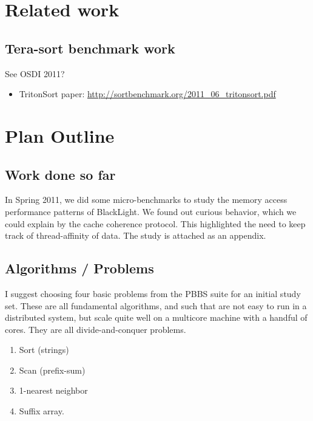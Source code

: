 \documentclass[12pt]{article}
\begin{document}
 
\section{Related work}

\subsection{Tera-sort benchmark work}

See OSDI 2011?

\begin{itemize}
\item TritonSort paper: \url{http://sortbenchmark.org/2011_06_tritonsort.pdf}
\end{itemize}

\section{Plan Outline}

\subsection{Work done so far}

In Spring 2011, we did some micro-benchmarks to study the memory access performance patterns of BlackLight.
We found out curious behavior, which we could explain by the cache coherence protocol. This highlighted the need
to keep track of thread-affinity of data.  The study is attached as an appendix.

\subsection{Algorithms / Problems}

I suggest choosing four basic problems from the PBBS suite for an initial study set. These are all
fundamental algorithms, and such that are not easy to run in a distributed system, but scale quite well
on a multicore machine with a handful of cores. They are all divide-and-conquer problems.

\begin{enumerate}
\item Sort (strings)
\item Scan (prefix-sum)
\item 1-nearest neighbor
\item Suffix array.

\end{enumerate}
\end{document}
